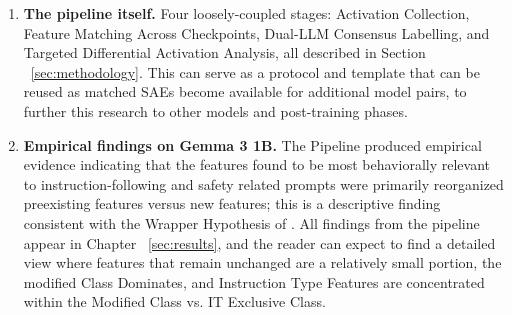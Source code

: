 \begin{enumerate}
    \item \textbf{The pipeline itself.} Four loosely-coupled stages: Activation Collection, Feature Matching Across Checkpoints, Dual-LLM Consensus Labelling, and Targeted Differential Activation Analysis, all described in Section ~\ref{sec:methodology}. This can serve as a protocol and template that can be reused as matched SAEs become available for additional model pairs, to further this research to other models and post-training phases.

    \item \textbf{Empirical findings on Gemma 3 1B.} The Pipeline produced empirical evidence indicating that the features found to be most behaviorally relevant to instruction-following and safety related prompts were primarily reorganized preexisting features versus new features; this is a descriptive finding consistent with the Wrapper Hypothesis of \textcite{jain_mechanistically_2024}. All findings from the pipeline appear in Chapter ~\ref{sec:results}, and the reader can expect to find a detailed view where features that remain unchanged are a relatively small portion, the modified Class Dominates, and Instruction Type Features are concentrated within the Modified Class vs. IT Exclusive Class.    
\end{enumerate}
